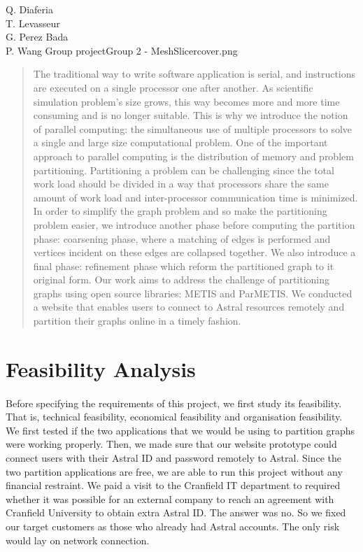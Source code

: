 \documentclass{cranfieldChart}
\begin{document}
{Q. Diaferia\\
T. Levasseur\\
G. Perez Bada\\
P. Wang
}{Group project}{Group 2 - MeshSlicer}{cover.png}

\newpage
\tableofcontents
\listoffigures
\newpage

\begin{abstract}
The traditional way to write software application is serial, and instructions are executed on a single processor one after another.
As scientific simulation problem's size grows, this way becomes more and more time consuming and is no longer suitable. This is why we introduce the notion of parallel computing: the simultaneous use of multiple processors to solve a single and large size computational problem. One of the important approach to parallel computing is the distribution of memory and problem partitioning. Partitioning a problem can be challenging since the total work load should be divided in a way that processors share the same amount of work load and inter-processor communication time is minimized. In order to simplify the graph problem and so make the partitioning problem easier, we introduce another phase before computing the partition phase: coarsening phase, where a matching of edges is performed and vertices incident on these edges are collapsed together. We also introduce a final phase: refinement phase which reform the partitioned graph to it original form. Our work aims to address the challenge of partitioning graphs using open source libraries: METIS and ParMETIS. We conducted a website that enables users to connect to Astral resources remotely and partition their graphs online in a timely fashion. 
\end{abstract}

\section{Feasibility Analysis} 
\paragraph{}
Before specifying the requirements of this project, we first study its feasibility. That is, technical feasibility, economical feasibility and organisation feasibility. We first tested if the two applications that we would be using to partition graphs were working properly. Then, we made sure that our website prototype could connect users with their Astral ID and password remotely to Astral. Since the two partition applications are free, we are able to run this project without any financial restraint. We paid a visit to the Cranfield IT department to required whether it was possible for an external company to reach an agreement with Cranfield University to obtain extra Astral ID. The answer was no. So we fixed our target customers as those who already had Astral accounts. The only risk would lay on network connection. 
\end{document}

